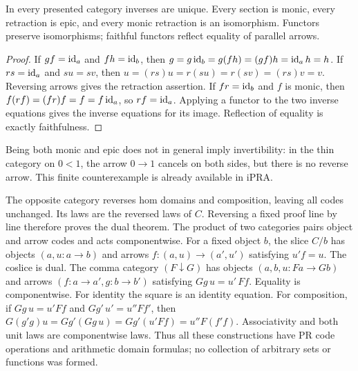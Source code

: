 \begin{proposition}\label{prop:elementary}
In every presented category inverses are unique. Every section is monic,
every retraction is epic, and every monic retraction is an isomorphism.
Functors preserve isomorphisms; faithful functors reflect equality of
parallel arrows.
\end{proposition}
\begin{proof}
If $gf=\operatorname{id}_a$ and $fh=\operatorname{id}_b$, then
$g=g\operatorname{id}_b=g(fh)=(gf)h=\operatorname{id}_a h=h$.
If $rs=\operatorname{id}_a$ and $su=sv$, then
$u=(rs)u=r(su)=r(sv)=(rs)v=v$.
Reversing arrows gives the retraction assertion.
If $fr=\operatorname{id}_b$ and $f$ is monic, then
$f(rf)=(fr)f=f=f\operatorname{id}_a$, so $rf=\operatorname{id}_a$.
Applying a functor to the two inverse equations gives the inverse equations
for its image. Reflection of equality is exactly faithfulness.
\end{proof}
Being both monic and epic does not in general imply invertibility: in the
thin category on $0<1$, the arrow $0\to1$ cancels on both sides, but there
is no reverse arrow. This finite counterexample is already available in iPRA.

The opposite category reverses hom domains and composition, leaving all
codes unchanged. Its laws are the reversed laws of $C$. Reversing a fixed
proof line by line therefore proves the dual theorem. The product of two
categories pairs object and arrow codes and acts componentwise.
For a fixed object $b$, the slice $C/b$ has objects $(a,u:a\to b)$ and
arrows $f:(a,u)\to(a',u')$ satisfying $u'f=u$.
The coslice is dual. The comma category $(F\downarrow G)$ has objects
$(a,b,u:Fa\to Gb)$ and arrows $(f:a\to a',g:b\to b')$ satisfying
$Gg\,u=u'\,Ff$. Equality is componentwise.
For identity the square is an identity equation. For composition, if
$Gg\,u=u'Ff$ and $Gg'\,u'=u''Ff'$, then
$G(g'g)u=Gg'(Gg\,u)=Gg'(u'Ff)=u''F(f'f)$.
Associativity and both unit laws are componentwise laws. Thus all these
constructions have PR code operations and arithmetic domain formulas;
no collection of arbitrary sets or functions was formed.
